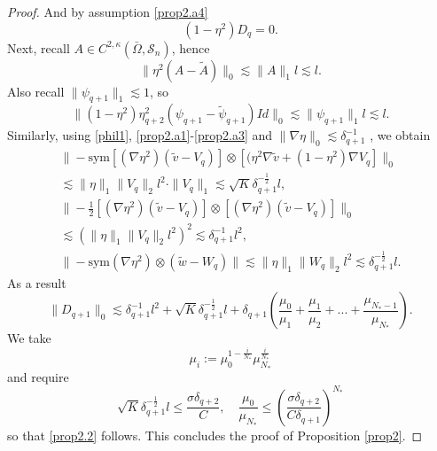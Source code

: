 \documentclass[reqno,12pt]{amsart}
\numberwithin{equation}{section}
\theoremstyle{plain}
\theoremstyle{definition}
\renewcommand{\S}{{\mathcal{S}_n}}
\newcommand{\sym}{\text{sym}}
\begin{document}
\begin{proof}
And by assumption \eqref{prop2.a4}
\begin{equation*}
    (1-\eta^2)D_q = 0.
\end{equation*}
Next, recall $A\in C^{2,\kappa}(\bar\Omega,\S)$, hence
\begin{equation*}
    \|\eta^2(A-\tilde A)\|_0\lesssim \|A\|_1 l\lesssim l.
\end{equation*}
Also recall $\|\psi_{q+1}\|_1\lesssim 1$, so
\begin{equation*}
\|(1-\eta^2)\eta_{q+2}^2(\psi_{q+1}-\tilde\psi_{q+1})Id\|_0\lesssim \|\psi_{q+1}\|_1 l\lesssim l.
\end{equation*}
Similarly, using \eqref{phil1}, \eqref{prop2.a1}-\eqref{prop2.a3} and $\|\nabla\eta\|_0\lesssim \delta_{q+1}^{-1}$ , we obtain
\begin{gather*}
    \|-\sym[(\nabla \eta^2)(\tilde v-V_q)]\otimes[(\eta^2\nabla\tilde v+(1-\eta^2)\nabla V_q]\|_0\\
    \lesssim \|\eta\|_1\|V_q\|_2 l^2\cdot\|V_q\|_1
    \lesssim \sqrt{K}\delta_{q+1}^{-\frac{1}{2}}l,\\
    \| -\frac{1}{2}[(\nabla \eta^2)(\tilde v-V_q)]\otimes[(\nabla \eta^2)(\tilde v-V_q)]\|_0\\
    \lesssim (\|\eta\|_1\|V_q\|_2 l^2)^2
    \lesssim \delta_{q+1}^{-1}l^2,\\
    \|-\sym(\nabla \eta^2)\otimes(\tilde w-W_q)\|
    \lesssim \|\eta\|_1\|W_q\|_2 l^2
    \lesssim \delta_{q+1}^{-\frac{1}{2}}l.
\end{gather*}
As a result
\begin{equation*}
     \|D_{q+1}\|_0\lesssim \delta_{q+1}^{-1}l^2+\sqrt{K}\delta_{q+1}^{-\frac{1}{2}}l+\delta_{q+1}(\frac{\mu_0}{\mu_1}+\frac{\mu_1}{\mu_2}+...+\frac{\mu_{N_*-1}}{\mu_{N_*}}).
\end{equation*}
We take
\begin{equation*}
    \mu_i:=\mu_0^{1-\frac{i}{N_*}}\mu_{N_*}^\frac{i}{N_*}
\end{equation*}
and require
\begin{equation}\label{ww1}
    \sqrt{K}\delta_{q+1}^{-\frac{1}{2}}l\le \frac{\sigma\delta_{q+2}}{C},\quad 
    \frac{\mu_0}{\mu_{N_*}}\le
    (\frac{\sigma\delta_{q+2}}{C\delta_{q+1}})^{N_*}
\end{equation}
so that \eqref{prop2.2} follows. This concludes the proof of Proposition \ref{prop2}.
\end{proof}
\end{document}
